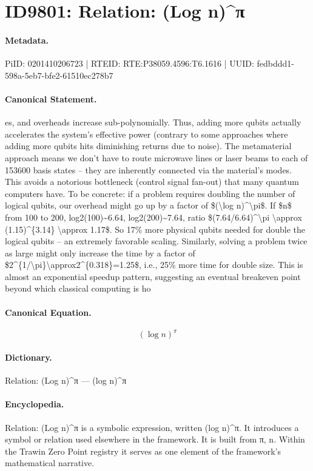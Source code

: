 \section*{ID9801: Relation: (Log n)\textasciicircum{}π}
\paragraph{Metadata.}
PiID: 0201410206723 | RTEID: RTE:P38059.4596:T6.1616 | UUID: fedbddd1-598a-5eb7-bfe2-61510ec278b7

\paragraph{Canonical Statement.}
es, and overheads increase sub-polynomially. Thus, adding more qubits actually accelerates the system’s effective power (contrary to some approaches where adding more qubits hits diminishing returns due to noise). The metamaterial approach means we don’t have to route microwave lines or laser beams to each of 153600 basis states – they are inherently connected via the material’s modes. This avoids a notorious bottleneck (control signal fan-out) that many quantum computers have. To be concrete: if a problem requires doubling the number of logical qubits, our overhead might go up by a factor of \$(\textbackslash{}log n)\textasciicircum{}\textbackslash{}pi\$. If \$n\$ from 100 to 200, log2(100)\textasciitilde{}6.64, log2(200)\textasciitilde{}7.64, ratio \$(7.64/6.64)\textasciicircum{}\textbackslash{}pi \textbackslash{}approx (1.15)\textasciicircum{}\{3.14\} \textbackslash{}approx 1.17\$. So 17\% more physical qubits needed for double the logical qubits – an extremely favorable scaling. Similarly, solving a problem twice as large might only increase the time by a factor of \$2\textasciicircum{}\{1/\textbackslash{}pi\}\textbackslash{}approx2\textasciicircum{}\{0.318\}=1.25\$, i.e., 25\% more time for double size. This is almost an exponential speedup pattern, suggesting an eventual breakeven point beyond which classical computing is ho

\paragraph{Canonical Equation.}
\[
(\log n)^\pi
\]

\paragraph{Dictionary.}
Relation: (Log n)\textasciicircum{}π — (log n)\textasciicircum{}π

\paragraph{Encyclopedia.}
Relation: (Log n)\textasciicircum{}π is a symbolic expression, written (log n)\textasciicircum{}π. It introduces a symbol or relation used elsewhere in the framework. It is built from π, n. Within the Trawin Zero Point registry it serves as one element of the framework's mathematical narrative.
